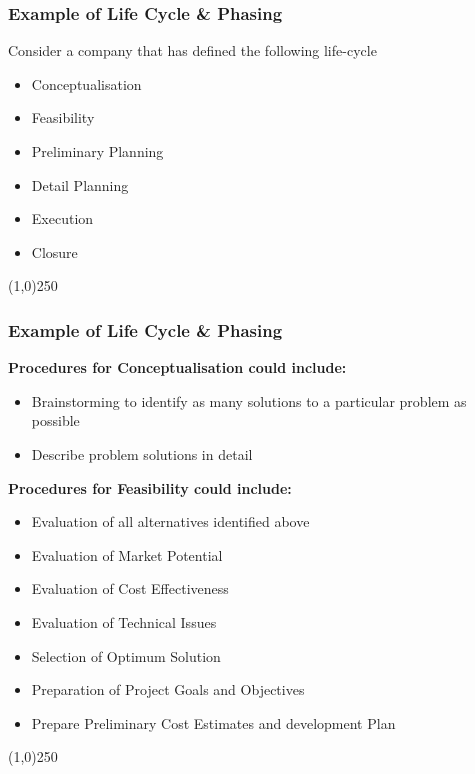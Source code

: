 \begin{frame}
\frametitle{Example of Life Cycle \& Phasing}
Consider a company that has defined the following life-cycle\\
\begin{itemize}
	\item Conceptualisation
	\item Feasibility
	\item Preliminary Planning
	\item Detail Planning
	\item Execution
	\item Closure
\end{itemize}
\end{frame}
\begin{center}\line(1,0){250}\end{center}



\begin{frame}
\frametitle{Example of Life Cycle \& Phasing}
\textbf{Procedures for Conceptualisation could include:}\\
\begin{itemize}
	\item Brainstorming to identify as many solutions to a particular problem as possible
	\item Describe problem solutions in detail
\end{itemize}
\textbf{Procedures for Feasibility could include:}\\
\begin{itemize}
	\item Evaluation of all alternatives identified above
	\item Evaluation of Market Potential
	\item Evaluation of Cost Effectiveness
	\item Evaluation of Technical Issues
	\item Selection of Optimum Solution 
	\item Preparation of Project Goals and Objectives 
	\item Prepare Preliminary Cost Estimates and development Plan
\end{itemize}
\end{frame}
\begin{center}\line(1,0){250}\end{center}



